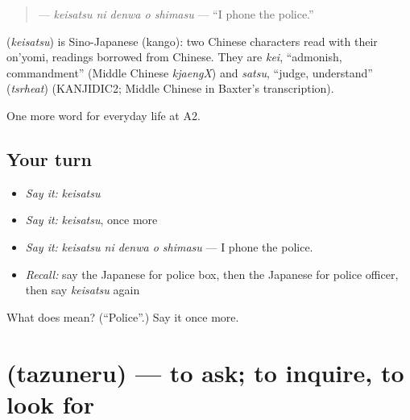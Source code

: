 \begin{quote}
\textbf{  } — \emph{keisatsu ni denwa o shimasu} — \textquotedblleft{}I phone the police.\textquotedblright{}
\end{quote}

\begin{cousinweb}
\textbf{} (\emph{keisatsu}) is Sino-Japanese (kango): two Chinese characters read with their on'yomi, readings borrowed from Chinese. They are \emph{kei}, \textquotedblleft{}admonish, commandment\textquotedblright{} (Middle Chinese \emph{kjaengX}) and \emph{satsu}, \textquotedblleft{}judge, understand\textquotedblright{} (\emph{tsrheat}) (KANJIDIC2; Middle Chinese in Baxter's transcription).
\end{cousinweb}

\begin{grammarlens}[title={What you've built}]
One more word for everyday life at A2.
\end{grammarlens}

\subsection*{Your turn}
\begin{itemize}
\raggedright
  \item \emph{Say it:} \emph{keisatsu}
  \item \emph{Say it:} \emph{keisatsu}, once more
  \item \emph{Say it:} \emph{keisatsu ni denwa o shimasu} — I phone the police.
  \item \emph{Recall:} say the Japanese for police box, then the Japanese for police officer, then say \emph{keisatsu} again
\end{itemize}

\begin{tcolorbox}[breakable,colback=teal!4,colframe=teal!35!black,title={Before you move on}]
What does  mean? (\textquotedblleft{}Police\textquotedblright{}.) Say it once more.
\end{tcolorbox}
\section[\texorpdfstring{\ja{たずねる} (tazuneru)}{たずねる (tazuneru)}]{ (tazuneru) — to ask; to inquire, to look for}

\label{lesson:JA-C192-tazuneru}



